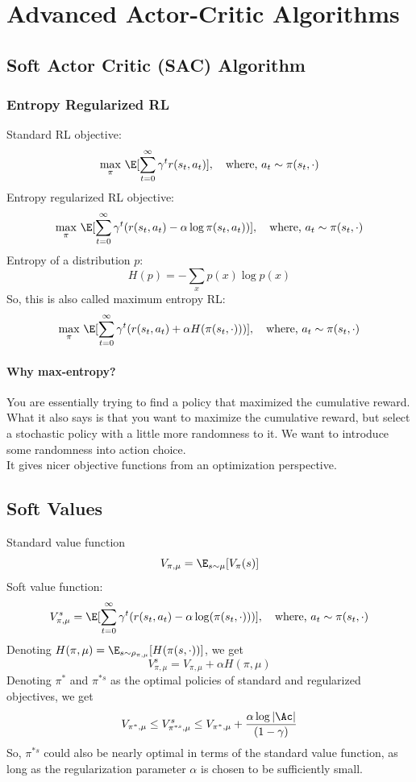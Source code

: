 \chapter{Advanced Actor-Critic Algorithms}
\section{Soft Actor Critic (SAC) Algorithm}
\subsection{Entropy Regularized RL}
Standard RL objective:
\[  
  \max_\pi \, \E[\sum_{t=0}^{\infty} \gamma^t r(s_t, a_t) ], \quad \text{where, } a_t \sim \pi(s_t, \cdot)
\] 
Entropy regularized RL objective:
\[
  \max_{\pi} \, \E[\sum_{t=0}^{\infty} \gamma^t (r(s_t, a_t) - \alpha \log \pi(s_t, a_t))], \quad \text{where, } a_t \sim \pi(s_t, \cdot)
\] 
Entropy of a distribution $p$:
\[
  H(p) = - \sum_{x} p(x) \log p(x)
\] 
So, this is also called maximum entropy RL:
\[
  \max_{\pi} \, \E [\sum_{t=0}^{\infty} \gamma^t (r(s_t,a_t) + \alpha H(\pi(s_t, \cdot)))], \quad \text{where, } a_t \sim \pi(s_t, \cdot)
\]
\subsubsection{Why max-entropy?}
You are essentially trying to find a policy that maximized the cumulative reward. What it also says is 
that you want to maximize the cumulative reward, but select a stochastic policy with a little more randomness 
to it. We want to introduce some randomness into action choice. \\ 

\noindent It gives nicer objective functions from an optimization perspective.

\section{Soft Values}
Standard value function 
\[
  V_{\pi, \mu} = \E_{s\sim \mu} [V_\pi (s)]
\] 
Soft value function:
\[
  V_{\pi,\mu}^s = \E[\sum_{t=0}^{\infty} \gamma^t (r(s_t, a_t) - \alpha \log (\pi(s_t, \cdot)))], \quad \text{where, } a_t \sim \pi(s_t, \cdot)
\] 
Denoting $H(\pi, \mu) = \E_{s\sim \rho_{\pi,\mu}} [H(\pi(s, \cdot))]$, we get 
\[
  V_{\pi,\mu}^s = V_{\pi,\mu} + \alpha H(\pi,\mu)
\] 
Denoting $\pi^*$ and $\pi^{*s}$ as the optimal policies of standard and regularized objectives, we get 
\[
  V_{\pi^*, \mu} \leq V_{\pi^{*s}, \mu}^s \leq V_{\pi^*, \mu} + \frac{\alpha \log |\Ac|}{(1-\gamma)}
\] 
So, $\pi^{*s}$ could also be nearly optimal in terms of the standard value function, as long as the regularization parameter $\alpha$ is chosen 
to be sufficiently small.

